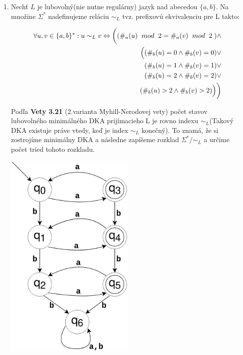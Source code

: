 \documentclass[11pt,a4paper]{article}
\begin{document}
\begin{enumerate}
    \item Nechť $L$ je lubovolný(nie nutne regulárny) jazyk nad abecedou $\{ a,b \}$. Na množine $\Sigma^*$ nadefinujeme reláciu $\sim_L$ tvz. prefixovú ekvivalenciu pre L takto: 

    \begin{equation*}
    \begin{aligned}
        \forall u, v \in \{a, b\}^*: u \sim_L v \Leftrightarrow \bigg( ( \#_a(u) \hspace{0.2cm}mod\hspace{0.2cm} 2 = \#_a(v) \hspace{0.2cm} mod \hspace{0.2cm} 2 \hspace{0.1cm} ) \land \\
        \Big( ( \#_b(u) = 0 \land \#_b(v) = 0 ) \lor \\ 
              ( \#_b(u) = 1 \land \#_b(v) = 1 ) \lor \\
              ( \#_b(u) = 2 \land \#_b(v) = 2 ) \lor \\
              ( \#_b(u) > 2 \land \#_b(v) > 2 ) \Big) \bigg)
    \end{aligned}
    \end{equation*}

    Podľa \textbf{Vety 3.21} (2.varianta Myhill-Nerodovej vety) počet stavov lubovolného minimálného DKA prijímacieho L je rovno indexu $\sim_L$(Takový DKA existuje práve vtedy, keď je index $\sim_L$ konečný). To znamá, že si zostrojíme minimálny DKA a následne zapíšeme rozklad $\Sigma^* / \sim_L$ a určime počet tried tohoto rozkladu.

    
    \begin{center}
        \includegraphics[width=0.5\textwidth]{5.eps}
    \end{center}
    \newpage


\end{enumerate}
\end{document}
